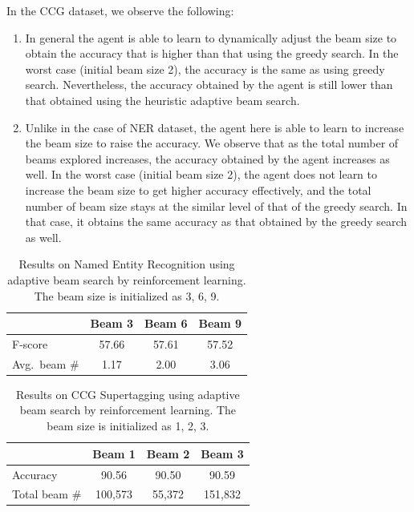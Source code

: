 \documentclass[11pt,a4paper]{article}
\begin{document}
In the CCG dataset, we observe the following:
\begin{enumerate}
\item In general the agent is able to learn to dynamically adjust the beam size to obtain the accuracy that is higher than that using the greedy search. In the worst case (initial beam size 2), the accuracy is the same as using greedy search. Nevertheless, the accuracy obtained by the agent is still lower than that obtained using the heuristic adaptive beam search.
\item Unlike in the case of NER dataset, the agent here is able to learn to increase the beam size to raise the accuracy. We observe that as the total number of beams explored increases, the accuracy obtained by the agent increases as well. In the worst case (initial beam size 2), the agent does not learn to increase the beam size to get higher accuracy effectively, and the total number of beam size stays at the similar level of that of the greedy search. In that case, it obtains the same accuracy as that obtained by the greedy search as well.
\end{enumerate}





\begin{table}
\centering
\caption{Results on Named Entity Recognition using adaptive beam search by reinforcement learning. The beam size is initialized as 3, 6, 9.}
\label{tab:NERRL}
\begin{tabular}{lccc}
\toprule
& Beam 3 & Beam 6 & Beam 9 \\
\midrule
F-score & 57.66 & 57.61 & 57.52 \\
Avg.~beam \# & 1.17 & 2.00 & 3.06 \\
\bottomrule
\end{tabular}
\end{table}


\begin{table}
\centering
\caption{Results on CCG Supertagging using adaptive beam search by reinforcement learning. The beam size is initialized as 1, 2, 3.}
\label{tab:CCGRL}
\begin{tabular}{lccc}
\toprule
& Beam 1 & Beam 2 & Beam 3 \\
\midrule
Accuracy & 90.56 & 90.50 & 90.59 \\
Total beam \# & 100,573 & 55,372 & 151,832 \\
\bottomrule
\end{tabular}
\end{table}
\end{document}
